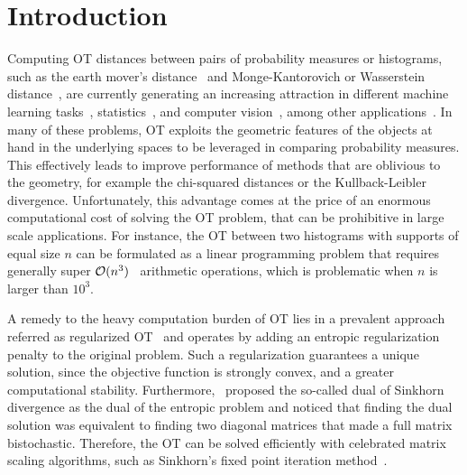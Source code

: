 
\section{Introduction} %
\label{sec:introduction}

Computing OT distances between pairs of probability measures or histograms, such as the earth mover's distance~\citep{werman1985,Rubner2000} and Monge-Kantorovich or Wasserstein distance~\citep{villani09optimal}, are currently generating an increasing attraction in different machine learning tasks~\citep{pmlr-v32-solomon14,kusnerb2015,pmlr-v70-arjovsky17a,ho2017}, statistics~\citep{frogner2015nips,panaretos2016,ebert2017ConstructionON,bigot2017,flamary2018WDA}, and computer vision~\citep{bonnel2011,Rubner2000,solomon2015}, among other applications~\citep{klouri17,peyre2019COTnowpublisher}.
In many of these problems, OT exploits the geometric features of the objects at hand in the underlying spaces to be leveraged in comparing probability measures.
This effectively leads to improve performance of methods that are oblivious to the geometry, for example the chi-squared distances or the Kullback-Leibler divergence.
Unfortunately, this advantage comes at the price of an enormous computational cost of solving the OT problem, that can be prohibitive in large scale applications.
For instance, the OT between two histograms with supports of equal size $n$ can be formulated as a linear programming problem that requires generally super $\mathcal{O}(n^3)$~\citep{pele2009} arithmetic operations, which is problematic when $n$ is larger than $10^3.$

A remedy to the heavy computation burden of OT lies in a prevalent approach referred as regularized OT~\citep{cuturinips13} and operates by adding an entropic regularization penalty to the original problem.  
Such a regularization guarantees a unique solution, since the objective function is strongly convex, and a greater computational stability.
Furthermore,~\citet{cuturinips13} proposed the so-called {dual of Sinkhorn divergence} as the dual of the entropic problem and noticed that finding the dual solution was equivalent to finding two diagonal matrices that made a full matrix bistochastic.
Therefore, the OT can be solved efficiently with celebrated matrix scaling algorithms, such as Sinkhorn's fixed point iteration method~\citep{sinkhorn1967,knight2008,kalantari2008}. 

